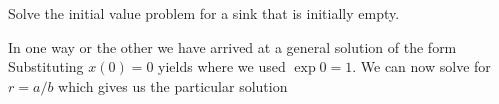 \subquestion Solve the initial value problem for a sink that is initially empty. 

\solution 

In one way or the other we have arrived at a general solution of the form 
Substituting $x(0)=0$ yields
where we used $\exp{0}=1$. We can now solve for $r=a/b$ which gives us the particular solution 
